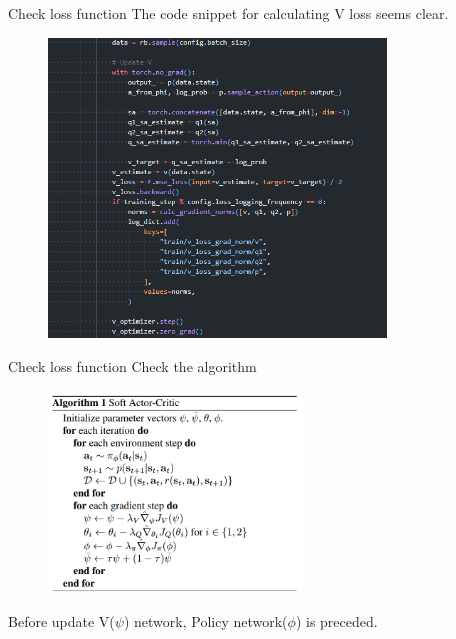 \documentclass[8pt]{beamer}
\newcommand{\mbb}[1]{\mathbb{#1}}
\begin{document}


\begin{frame}{Check loss function}
    The code snippet for calculating V loss seems clear.

    \begin{figure}
        \centering
        \includegraphics[width=0.8\textwidth]{fig5.png}
    \end{figure}

\end{frame}

\begin{frame}{Check loss function}
    Check the algorithm
    \begin{figure}
        \centering
        \includegraphics[width=0.6\textwidth]{fig6.png}
    \end{figure}
    Before update V($\psi$) network, Policy network($\phi$) is preceded.
\end{frame}
\end{document}
